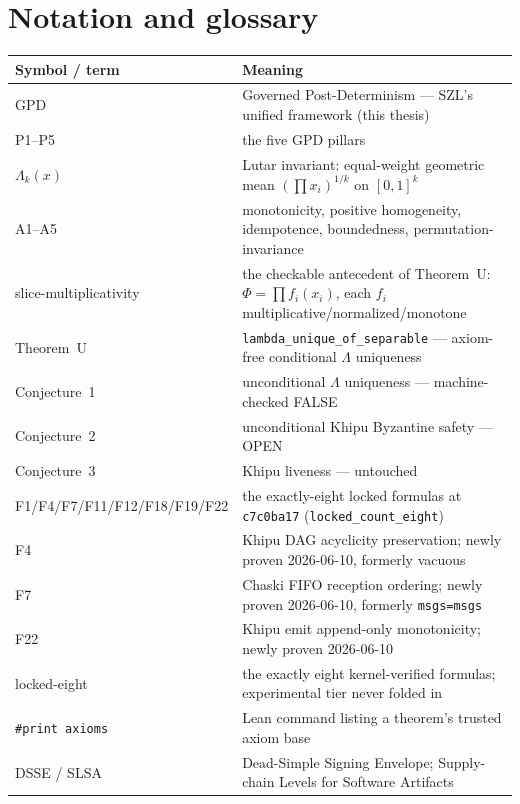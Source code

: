 \documentclass[11pt,letterpaper]{article}
\theoremstyle{definition}
\newcommand{\Lam}{\Lambda}
\begin{document}
\section{Notation and glossary}
\begin{center}\small
\begin{longtable}{@{}p{4.0cm}p{9.0cm}@{}}
\toprule
\textbf{Symbol / term} & \textbf{Meaning} \\
\midrule
\endhead
GPD & Governed Post-Determinism --- SZL's unified framework (this thesis) \\
P1--P5 & the five GPD pillars \\
$\Lam_k(x)$ & Lutar invariant: equal-weight geometric mean $(\prod x_i)^{1/k}$ on $[0,1]^k$ \\
A1--A5 & monotonicity, positive homogeneity, idempotence, boundedness, permutation-invariance \\
slice-multiplicativity & the checkable antecedent of Theorem~U: $\Phi=\prod f_i(x_i)$, each $f_i$ multiplicative/normalized/monotone \\
Theorem~U & \texttt{lambda\_unique\_of\_separable} --- axiom-free conditional $\Lam$ uniqueness \\
Conjecture~1 & unconditional $\Lam$ uniqueness --- machine-checked FALSE \\
Conjecture~2 & unconditional Khipu Byzantine safety --- OPEN \\
Conjecture~3 & Khipu liveness --- untouched \\
F1/F4/F7/F11/F12/F18/F19/F22 & the exactly-eight locked formulas at \texttt{c7c0ba17} (\texttt{locked\_count\_eight}) \\
F4 & Khipu DAG acyclicity preservation; newly proven 2026-06-10, formerly vacuous \\
F7 & Chaski FIFO reception ordering; newly proven 2026-06-10, formerly \texttt{msgs=msgs} \\
F22 & Khipu emit append-only monotonicity; newly proven 2026-06-10 \\
locked-eight & the exactly eight kernel-verified formulas; experimental tier never folded in \\
\texttt{\#print axioms} & Lean command listing a theorem's trusted axiom base \\
DSSE / SLSA & Dead-Simple Signing Envelope; Supply-chain Levels for Software Artifacts \\
\bottomrule
\end{longtable}
\end{center}
\end{document}
